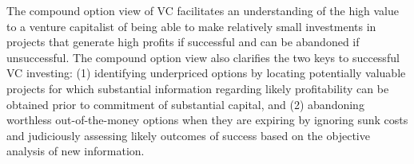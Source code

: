 \documentclass[11pt]{article}
\begin{document}
The compound option view of VC facilitates an understanding of the high value to a venture capitalist of being able to make relatively small investments in projects that generate high profits if successful and can be abandoned if unsuccessful. The compound option view also clarifies the two keys to successful VC investing: (1) identifying underpriced options by locating potentially valuable projects for which substantial information regarding likely profitability can be obtained prior to commitment of substantial capital, and (2) abandoning worthless out-of-the-money options when they are expiring by ignoring sunk costs and judiciously assessing likely outcomes of success based on the objective analysis of new information.
\end{document}
